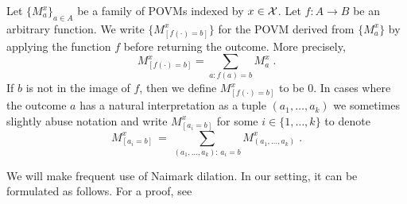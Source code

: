 \begin{definition}
  \label{def:bracket}
  Let $\{M^x_a\}_{a\in A}$ be a family of POVMs indexed by $x\in \cal{X}$.
  Let $f:A\to B$ be an arbitrary function.
  We write $\bigl\{ M^x_{[f(\cdot)=b]} \bigr\}$ for the POVM derived from
  $\{M^x_a\}$ by applying the function $f$ before returning the outcome.
  More precisely,
\begin{equation*}
  M^x_{[f(\cdot) = b]} = \sum_{a : f(a)=b} M^x_a\;.
\end{equation*}
If $b$ is not in the image of $f$, then we define $M^x_{[f(\cdot) = b]}$ to be
$0$. In cases where the outcome $a$ has a natural interpretation as a tuple $(a_1,\ldots,a_k)$ we sometimes slightly abuse notation and write $M^x_{[a_i=b]}$ for some $i\in \{1,\ldots,k\}$ to denote 
\[ M^x_{[a_i=b]} \,=\,\sum_{(a_1,\ldots,a_k):\,a_i=b} M^x_{(a_1,\ldots,a_k)}\;.\]
\end{definition}

We will make frequent use of Naimark dilation. In our setting, it can be formulated as follows. For a proof, see~\cite[Theorem 5.1]{ML20}

